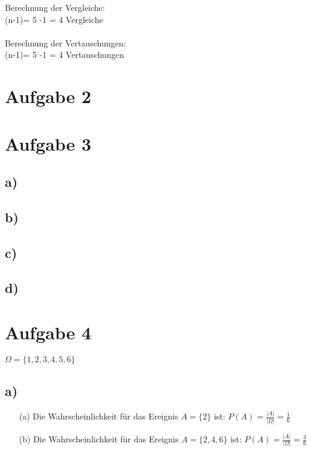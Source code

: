 \documentclass[a4paper]{scrartcl}
\begin{document}
Berechnung der Vergleiche:\\
(n-1)= 5 -1 = 4 Vergleiche  \\
\\
Berechnung der Vertauschungen:\\
(n-1)= 5 -1 = 4 Vertauschungen  \\


\section*{Aufgabe 2}

\section*{Aufgabe 3}
\subsection*{a)}
\subsection*{b)}
\subsection*{c)}
\subsection*{d)}

\section*{Aufgabe 4}
$\Omega = \{1, 2, 3, 4, 5, 6\}$
\subsection*{a)}
\begin{itemize}
\item[(a)] 
Die Wahrscheinlichkeit für das Ereignis $A=\{2\}$ ist: $P(A)=\frac{|A|}{|\Omega|}=\frac{1}{6}$
\item[(b)]
Die Wahrscheinlichkeit für das Ereignis $A=\{2, 4, 6\}$ ist: $P(A)=\frac{|A|}{|\Omega|}=\frac{3}{6}$
\end{itemize}
\end{document}
